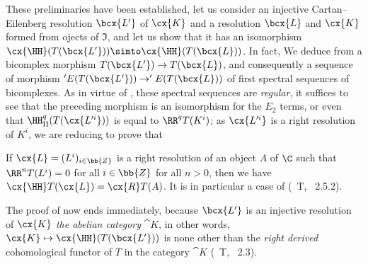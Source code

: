 \begin{env}[11.5.2.3]
\label{0.11.5.2.3}
These preliminaries have been established, let us consider an injective Cartan--Eilenberg resolution $\bcx{L'}$ of $\cx{K}$ and a resolution $\bcx{L}$ and $\cx{K}$ formed from ojects of $\mathfrak{I}$, 
and let us show that it has an isomorphism $\cx{\HH}(T(\bcx{L'}))\simto \cx{\HH}(T(\bcx{L}))$. In fact, We deduce from  a bicomplex morphism $T(\bcx{L'})\rightarrow T(\bcx{L})$, 
and consequently a sequence of morphism $'E(T(\bcx{L'}))\rightarrow 'E(T(\bcx{L}))$ of first spectral sequences of bicomplexes.
As in virtue of , these spectral sequences are \emph{regular}, it suffices  to see that the preceding morphism is an isomorphism for the $E_2$ terms, 
or even that $\HH_\text{II}^q(T(\cx{L'^i}))$ is equal to $\RR^q T(K^i)$; as $\cx{L'^i}$ is a right resolution of $K^i$, we are reducing to prove that
\end{env}
  
\begin{lemma}[11.5.2.4]
\label{0.11.5.2.4}
If $\cx{L} = (L^i)_{i\in \bb{Z}}$ is a right resolution of an object $A$ of $\C$ such that $\RR^n T(L^i) = 0$ for all $i\in \bb{Z}$ for all $n>0$, then we have $\cx{\HH}T(\cx{L}) = \cx{R} T(A)$.
It is in particular a case of (~T, ~2.5.2).
\end{lemma}

\begin{env}[11.5.2.5]
\label{0.11.5.2.5}
The proof of  now ends immediately, because $\bcx{L'}$ is an injective resolution of $\cx{K}$ \emph{the abelian category} $\cat{K}$,
in other words, $\cx{K} \mapsto \cx{\HH}(T(\bcx{L'}))$ is none other than the \emph{right derived} cohomological functor of $T$ in the category $\cat{K}$ (~T, ~2.3).
\end{env}

